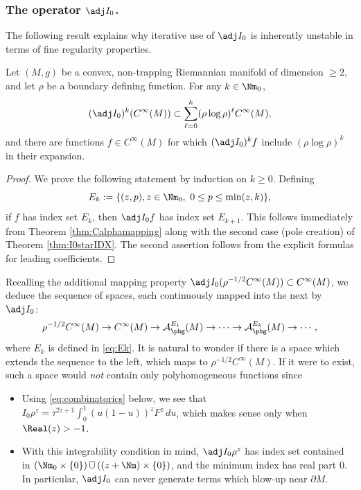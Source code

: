 
\subsubsection*{The operator $\adj I_0$.}
The following result explains why iterative use of $\adj I_0$ is inherently unstable in terms of fine regularity
properties.

\begin{Corollary} Let $(M,g)$ be a convex, non-trapping Riemannian manifold of dimension $\ge 2$, and let $\rho$ be a boundary defining function. For any $k\in \Nm_0$,
\begin{equation*}
(\adj I_0)^k (C^\infty(M)) \subset \sum_{\ell=0}^k (\rho\log \rho)^\ell C^\infty(M),
\end{equation*}
and there are functions $f \in C^\infty(M)$ for which $(\adj I_0)^k f$ include $(\rho\log \rho)^k$ in their expansion.
\end{Corollary}

\begin{proof}
We prove the following statement by induction on $k\ge 0$. Defining
\begin{equation}
E_k := \{ (z,p), z\in \Nm_0,\ 0\le p\le \min (z,k) \},
\label{eq:Ek}
\end{equation}
if $f$ has index set $E_k$, then $\adj I_0 f$ has index set $E_{k+1}$. This follows immediately from Theorem \ref{thm:Calphamapping} along with the second case (pole creation) of Theorem \ref{thm:I0starIDX}. The second assertion follows from the explicit formulas for leading coefficients.
\end{proof}

Recalling the additional mapping property $\adj I_0 (\rho^{-1/2} C^\infty (M))\subset C^\infty(M)$, we deduce the sequence of spaces, each continuously mapped into the next by $\adj I_0$:
\begin{equation}
\rho^{-1/2} C^\infty(M) \to C^\infty(M) \to {\cal A}_{\phg}^{E_1} (M) \to \cdots \to {\cal A}_{\phg}^{E_k} (M) \to \cdots,
\label{eq:seqspaces}
\end{equation}
where $E_k$ is defined in \eqref{eq:Ek}. It is natural to wonder if there is a space which extends the sequence to the left, \ie which maps to $\rho^{-1/2} C^\infty(M)$. If it were to exist, such a space would {\it not} contain only polyhomogeneous functions since
\begin{itemize}
\item Using \eqref{eq:combinatorics} below, we see that $I_0 \rho^z = \tau^{2z+1} \int_0^1 (u(1-u))^z F^z\,du$, which makes sense only when $\Real(z)>-1$.
\item With this integrability condition in mind, $\adj I_0 \rho^z$ has index set contained in $(\Nm_0 \times \{0\})\, \overline{\cup} \, ((z+\Nm)\times \{0\})$, and the minimum index has real part $0$. In particular, $\adj I_0$ can never generate terms which blow-up near $\partial M$.
\end{itemize}

